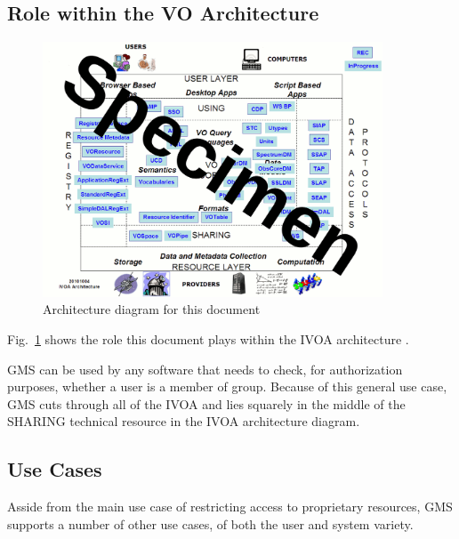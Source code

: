 \documentclass[11pt,a4paper]{ivoa}
\begin{document}
\subsection{Role within the VO Architecture}

\begin{figure}
\centering


\includegraphics[width=0.9\textwidth]{archdiag.png}
\caption{Architecture diagram for this document}
\label{fig:archdiag}
\end{figure}

Fig.~\ref{fig:archdiag} shows the role this document plays within the
IVOA architecture \citep{note:VOARCH}.

GMS can be used by any software that needs to check, for authorization purposes, whether a user is a member of group.  Because of this general use case, GMS cuts through all of the IVOA and lies squarely in the middle of the SHARING technical resource in the IVOA architecture diagram.

\subsection{Use Cases}

Asside from the main use case of restricting access to proprietary resources, GMS supports a number of other use cases, of both the user and system variety.
\end{document}
